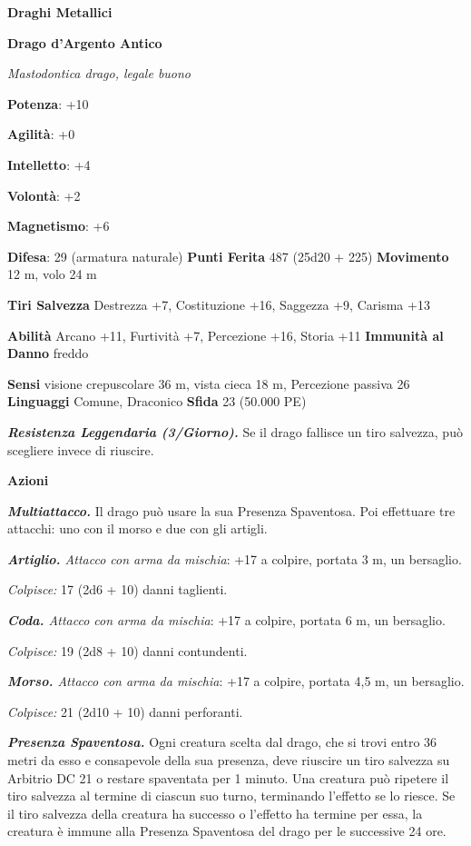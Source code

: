 \begin{multicols}{2}
\textbf{Draghi Metallici}

\textbf{Drago d'Argento Antico}

\emph{Mastodontica drago, legale buono}

\textbf{Potenza}: +10

\textbf{Agilità}: +0

\textbf{Intelletto}: +4

\textbf{Volontà}: +2

\textbf{Magnetismo}: +6

\textbf{Difesa}: 29 (armatura naturale) \textbf{Punti Ferita}
487 (25d20 + 225) \textbf{Movimento} 12 m, volo 24 m

\textbf{Tiri Salvezza} Destrezza +7, Costituzione +16, Saggezza +9,
Carisma +13

\textbf{Abilità} Arcano +11, Furtività +7, Percezione +16, Storia +11
\textbf{Immunità al Danno} freddo

\textbf{Sensi} visione crepuscolare 36 m, vista cieca 18 m, Percezione passiva
26 \textbf{Linguaggi} Comune, Draconico \textbf{Sfida} 23 (50.000 PE)

\emph{\textbf{Resistenza Leggendaria (3/Giorno).}} Se il drago fallisce
un tiro salvezza, può scegliere invece di riuscire.

\textbf{Azioni}

\emph{\textbf{Multiattacco.}} Il drago può usare la sua Presenza
Spaventosa. Poi effettuare tre attacchi: uno con il morso e due con gli
artigli.

\emph{\textbf{Artiglio.} Attacco con arma da mischia}: +17 a colpire,
portata 3 m, un bersaglio.

\emph{Colpisce:} 17 (2d6 + 10) danni taglienti.

\emph{\textbf{Coda.} Attacco con arma da mischia}: +17 a colpire,
portata 6 m, un bersaglio.

\emph{Colpisce:} 19 (2d8 + 10) danni contundenti.

\emph{\textbf{Morso.} Attacco con arma da mischia}: +17 a colpire,
portata 4,5 m, un bersaglio.

\emph{Colpisce:} 21 (2d10 + 10) danni perforanti.

\emph{\textbf{Presenza Spaventosa.}} Ogni creatura scelta dal drago, che
si trovi entro 36 metri da esso e consapevole della sua presenza, deve
riuscire un tiro salvezza su Arbitrio DC 21 o restare spaventata per 1
minuto. Una creatura può ripetere il tiro salvezza al termine di ciascun
suo turno, terminando l'effetto se lo riesce. Se il tiro salvezza della
creatura ha successo o l'effetto ha termine per essa, la creatura è
immune alla Presenza Spaventosa del drago per le successive 24 ore.


\end{multicols}
